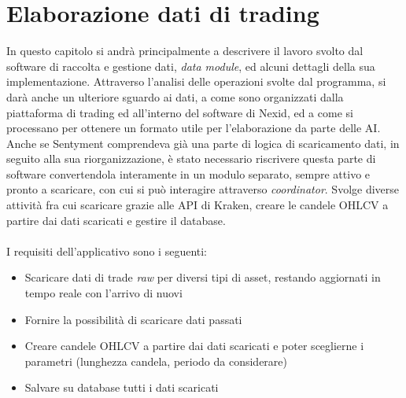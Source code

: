 \documentclass[a4paper,12pt]{report}
\begin{document}
\chapter{Elaborazione dati di trading}
\label{cap3}
In questo capitolo si andrà principalmente a descrivere il lavoro svolto dal software di raccolta e gestione dati, \textit{data module}, ed alcuni dettagli della sua implementazione. Attraverso l'analisi delle operazioni svolte dal programma, si darà anche un ulteriore sguardo ai dati, a come sono organizzati dalla piattaforma di trading ed all'interno del software di Nexid, ed a come si processano per ottenere un formato utile per l'elaborazione da parte delle AI.\\
Anche se Sentyment comprendeva già una parte di logica di scaricamento dati, in seguito alla sua riorganizzazione, è stato necessario riscrivere questa parte di software convertendola interamente in un modulo separato, sempre attivo e pronto a scaricare, con cui si può interagire attraverso \textit{coordinator}. Svolge diverse attività fra cui scaricare grazie alle API di Kraken, creare le candele OHLCV a partire dai dati scaricati e gestire il database.\\~\\
I requisiti dell'applicativo sono i seguenti:
\begin{itemize}
	\item Scaricare dati di trade \textit{raw} per diversi tipi di asset, restando aggiornati in tempo reale con l'arrivo di nuovi
	\item Fornire la possibilità di scaricare dati passati
	\item Creare candele OHLCV a partire dai dati scaricati e poter sceglierne i parametri (lunghezza candela, periodo da considerare)
	\item Salvare su database tutti i dati scaricati
\end{itemize}
\end{document}
